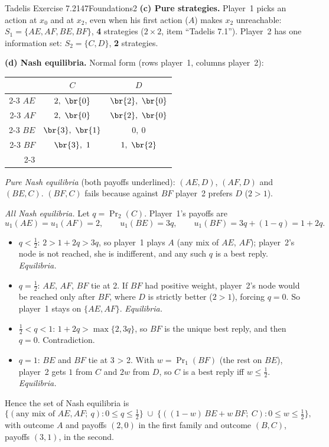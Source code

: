 \begin{exsol}{Tadelis Exercise 7.2}{147}{Foundations}{2}
\textbf{(c) Pure strategies.} Player~1 picks an action at $x_0$ and at $x_2$, even when his
first action ($A$) makes $x_2$ unreachable: $S_1 = \{AE, AF, BE, BF\}$, \textbf{4} strategies
($2 \times 2$, item ``Tadelis 7.1''). Player~2 has one information set: $S_2 = \{C, D\}$,
\textbf{2} strategies.

\textbf{(d) Nash equilibria.} Normal form (rows player~1, columns player~2):
\begin{center}
\begin{tabular}{r|c|c|}
\multicolumn{1}{r}{} & \multicolumn{1}{c}{$C$} & \multicolumn{1}{c}{$D$}\\ \cline{2-3}
$AE$ & $2,\ \br{0}$ & $\br{2},\ \br{0}$ \\ \cline{2-3}
$AF$ & $2,\ \br{0}$ & $\br{2},\ \br{0}$ \\ \cline{2-3}
$BE$ & $\br{3},\ \br{1}$ & $0,\ 0$ \\ \cline{2-3}
$BF$ & $\br{3},\ 1$ & $1,\ \br{2}$ \\ \cline{2-3}
\end{tabular}
\end{center}
\emph{Pure Nash equilibria} (both payoffs underlined): $(AE, D)$, $(AF, D)$ and $(BE, C)$.
$(BF, C)$ fails because against $BF$ player~2 prefers $D$ ($2 > 1$).

\emph{All Nash equilibria.} Let $q = \Pr_2(C)$. Player~1's payoffs are
\[
  u_1(AE) = u_1(AF) = 2, \qquad u_1(BE) = 3q, \qquad u_1(BF) = 3q + (1-q) = 1 + 2q .
\]
\begin{itemize}
  \item $q < \frac12$: $2 > 1 + 2q > 3q$, so player~1 plays $A$ (any mix of $AE$, $AF$); player~2's
  node is not reached, she is indifferent, and any such $q$ is a best reply. \emph{Equilibria.}
  \item $q = \frac12$: $AE$, $AF$, $BF$ tie at 2. If $BF$ had positive weight, player~2's node would
  be reached only after $BF$, where $D$ is strictly better ($2 > 1$), forcing $q = 0$. So player~1
  stays on $\{AE, AF\}$. \emph{Equilibria.}
  \item $\frac12 < q < 1$: $1 + 2q > \max\{2, 3q\}$, so $BF$ is the unique best reply, and then
  $q = 0$. Contradiction.
  \item $q = 1$: $BE$ and $BF$ tie at 3 > 2. With $w = \Pr_1(BF)$ (the rest on $BE$), player~2
  gets $1$ from $C$ and $2w$ from $D$, so $C$ is a best reply iff $w \le \frac12$. \emph{Equilibria.}
\end{itemize}
Hence the set of Nash equilibria is
\[
  \bigl\{(\text{any mix of } AE, AF;\ q) : 0 \le q \le \tfrac12\bigr\}
  \;\cup\; \bigl\{((1-w)\,BE + w\,BF;\ C) : 0 \le w \le \tfrac12\bigr\},
\]
with outcome $A$ and payoffs $(2,0)$ in the first family and outcome $(B, C)$, payoffs $(3,1)$, in
the second.


\end{exsol}
